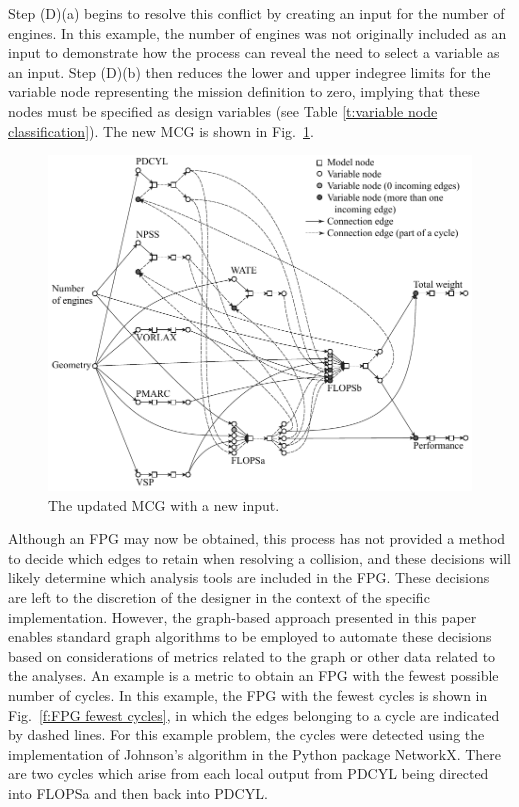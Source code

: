 Step (D)(a) begins to resolve this conflict by creating an input for the number of engines. 
In this example, the number of engines was not originally included as an input to demonstrate how the process can reveal the need to select a variable as an input.
Step (D)(b) then reduces the lower and upper indegree limits for the variable node representing the mission definition to zero, implying that these nodes must be specified as design variables (see Table \ref{t:variable node classification}). 
The new MCG is shown in Fig.~\ref{f:MCG}.
	\begin{figure}[htb!]
	  \begin{center}
		\includegraphics[width=6in]{images/MCG_edit}
	  \end{center}
	  \caption{The updated MCG with a new input.}
	\label{f:MCG}
	\end{figure}

	Although an FPG may now be obtained, this process has not provided a method to decide which edges to retain when resolving a collision, and these decisions will likely determine which analysis tools are included in the FPG. These decisions are left to the discretion of the designer in the context of the specific implementation. 
	However, the graph-based approach presented in this paper enables standard graph algorithms to be employed to automate these decisions based on considerations of metrics related to the graph or other data related to the analyses. 
	An example is a metric to obtain an FPG with the fewest possible number of cycles. 
In this example, the FPG with the fewest cycles is shown in Fig.~\ref{f:FPG fewest cycles}, in which the edges belonging to a cycle are indicated by dashed lines. 
For this example problem, the cycles were detected using the implementation of Johnson's algorithm \cite{Johnson1975} in the Python package NetworkX. 
There are two cycles which arise from each local output from PDCYL being directed into FLOPSa and then back into PDCYL. 

